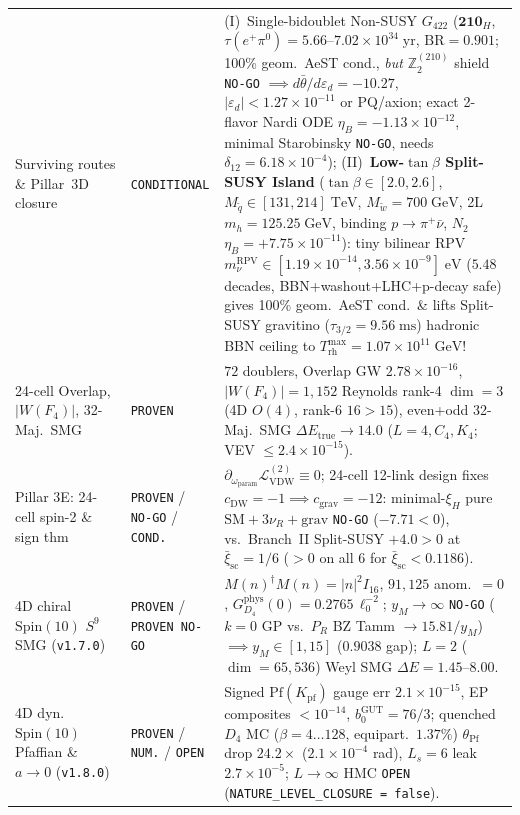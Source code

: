 \documentclass[11pt,a4paper]{article}
\begin{document}
\begin{table}[t!]
\begin{tabular}{p{3.9cm}p{2.0cm}p{9.2cm}}
Surviving routes \& Pillar~3D closure & \texttt{CONDITIONAL} & (I)~Single-bidoublet Non-SUSY $G_{422}$ ($\mathbf{210}_H$, $\tau(e^+\pi^0)=5.66\text{--}7.02\times 10^{34}\;\mathrm{yr}$, $\mathrm{BR}=0.901$; 100\% geom.\ AeST cond., \emph{but} $\mathbb{Z}_2^{(210)}$ shield \texttt{NO-GO} $\implies d\bar\theta/d\varepsilon_d=-10.27$, $|\varepsilon_d|<1.27\times 10^{-11}$ or PQ/axion; exact 2-flavor Nardi ODE $\eta_B=-1.13\times 10^{-12}$, minimal Starobinsky \texttt{NO-GO}, needs $\delta_{12}=6.18\times 10^{-4}$); (II)~\textbf{Low-$\tan\beta$ Split-SUSY Island} ($\tan\beta\in[2.0,2.6]$, $M_{\tilde q}\in[131,214]\;\mathrm{TeV}$, $M_{\tilde w}=700\;\mathrm{GeV}$, 2L $m_h=125.25\;\mathrm{GeV}$, binding $p\to\pi^+\bar\nu$, $N_2$ $\eta_B=+7.75\times 10^{-11}$): tiny bilinear RPV $m_\nu^{\mathrm{RPV}}\in[1.19\times 10^{-14}, 3.56\times 10^{-9}]\;\mathrm{eV}$ ($5.48$ decades, BBN+washout+LHC+p-decay safe) gives 100\% geom.\ AeST cond.\ \& lifts Split-SUSY gravitino ($\tau_{3/2}=9.56\;\mathrm{ms}$) hadronic BBN ceiling to $T_{\mathrm{rh}}^{\max}=1.07\times 10^{11}\;\mathrm{GeV}$! \\
24-cell Overlap, $|W(F_4)|$, 32-Maj.\ SMG & \texttt{PROVEN} & $72$ doublers, Overlap GW $2.78\times 10^{-16}$, $|W(F_4)|=1{,}152$ Reynolds rank-4 $\dim=3$ (4D $O(4)$, rank-6 $16>15$), even+odd 32-Maj.\ SMG $\Delta E_{\mathrm{true}}\to 14.0$ ($L=4, C_4, K_4$; VEV $\le 2.4\times 10^{-15}$). \\
Pillar 3E: 24-cell spin-2 \& sign thm & \texttt{PROVEN} / \texttt{NO-GO} / \texttt{COND.} & $\partial_{\omega_{\mathrm{param}}}\mathcal{L}_{\mathrm{VDW}}^{(2)}\equiv 0$; 24-cell 12-link design fixes $c_{\mathrm{DW}}=-1\implies c_{\mathrm{grav}}=-12$: minimal-$\xi_H$ pure $\mathrm{SM}+3\nu_R+\text{grav}$ \texttt{NO-GO} ($-7.71<0$), vs.\ Branch~II Split-SUSY $+4.0>0$ at $\bar\xi_{\mathrm{sc}}=1/6$ ($>0$ on all 6 for $\bar\xi_{\mathrm{sc}}<0.1186$). \\
4D chiral $\mathrm{Spin}(10)$ $S^9$ SMG (\texttt{v1.7.0}) & \texttt{PROVEN} / \texttt{PROVEN NO-GO} & $M(n)^\dagger M(n)=|n|^2 I_{16}$, $91{,}125$ anom.\ $=0$, $G_{D_4}^{\mathrm{phys}}(0)=0.2765\,\ell_0^{-2}$; $y_M\to\infty$ \texttt{NO-GO} ($k=0$ GP vs.\ $P_R$ BZ Tamm $\to 15.81/y_M$) $\implies y_M\in[1,15]$ ($0.9038$ gap); $L=2$ ($\dim=65{,}536$) Weyl SMG $\Delta E=1.45\text{--}8.00$. \\
4D dyn.\ $\mathrm{Spin}(10)$ Pfaffian \& $a\to 0$ (\texttt{v1.8.0}) & \texttt{PROVEN} / \texttt{NUM.} / \texttt{OPEN} & Signed $\mathrm{Pf}(K_{\mathrm{pf}})$ gauge err $2.1\times 10^{-15}$, EP composites $<10^{-14}$, $b_0^{\mathrm{GUT}}=76/3$; quenched $D_4$ MC ($\beta=4\dots 128$, equipart.\ $1.37\%$) $\theta_{\mathrm{Pf}}$ drop $24.2\times$ ($2.1\times 10^{-4}$ rad), $L_s=6$ leak $2.7\times 10^{-5}$; $L\to\infty$ HMC \texttt{OPEN} (\texttt{NATURE\_LEVEL\_CLOSURE = false}). \\
\bottomrule
\end{tabular}
\end{table}
\end{document}
